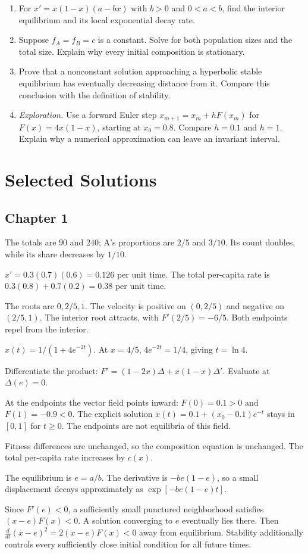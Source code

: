 \documentclass[11pt,oneside,openany]{book}
\theoremstyle{definition}
\theoremstyle{remark}
\newenvironment{exercises}{\begin{enumerate}[label=\thechapter.\arabic*,ref=\thechapter.\arabic*,leftmargin=2.8em,itemsep=6pt]}{\end{enumerate}}
\newenvironment{answers}{\begin{description}[leftmargin=2.9em,labelwidth=2.5em,labelsep=.4em,itemsep=8pt,font=\normalfont\bfseries]}{\end{description}}
\numberwithin{equation}{chapter}
\begin{document}
\begin{exercises}
\item For $x'=x(1-x)(a-bx)$ with $b>0$ and $0<a<b$, find the interior equilibrium and its local exponential decay rate.
\item Suppose $f_A=f_B=c$ is a constant. Solve for both population sizes and the total size. Explain why every initial composition is stationary.
\item Prove that a nonconstant solution approaching a hyperbolic stable equilibrium has eventually decreasing distance from it. Compare this conclusion with the definition of stability.
\item \emph{Exploration.} Use a forward Euler step $x_{m+1}=x_m+hF(x_m)$ for $F(x)=4x(1-x)$, starting at $x_0=0.8$. Compare $h=0.1$ and $h=1$. Explain why a numerical approximation can leave an invariant interval.
\end{exercises}

\clearpage\backmatter
\chapter*{Selected Solutions}
\section*{Chapter 1}
\begin{answers}
\item[1.1] The totals are $90$ and $240$; A's proportions are $2/5$ and $3/10$. Its count doubles, while its share decreases by $1/10$.
\item[1.3] $x'=0.3(0.7)(0.6)=0.126$ per unit time. The total per-capita rate is $0.3(0.8)+0.7(0.2)=0.38$ per unit time.
\item[1.5] The roots are $0,2/5,1$. The velocity is positive on $(0,2/5)$ and negative on $(2/5,1)$. The interior root attracts, with $F'(2/5)=-6/5$. Both endpoints repel from the interior.
\item[1.7] $x(t)=1/(1+4e^{-2t})$. At $x=4/5$, $4e^{-2t}=1/4$, giving $t=\ln4$.
\item[1.9] Differentiate the product: $F'=(1-2x)\Delta+x(1-x)\Delta'$. Evaluate at $\Delta(e)=0$.
\item[1.11] At the endpoints the vector field points inward: $F(0)=0.1>0$ and $F(1)=-0.9<0$. The explicit solution $x(t)=0.1+(x_0-0.1)e^{-t}$ stays in $[0,1]$ for $t\geq0$. The endpoints are not equilibria of this field.
\item[1.13] Fitness differences are unchanged, so the composition equation is unchanged. The total per-capita rate increases by $c(x)$.
\item[1.15] The equilibrium is $e=a/b$. The derivative is $-be(1-e)$, so a small displacement decays approximately as $\exp[-be(1-e)t]$.
\item[1.17] Since $F'(e)<0$, a sufficiently small punctured neighborhood satisfies $(x-e)F(x)<0$. A solution converging to $e$ eventually lies there. Then $\frac{d}{dt}(x-e)^2=2(x-e)F(x)<0$ away from equilibrium. Stability additionally controls every sufficiently close initial condition for all future times.
\end{answers}
\end{document}
